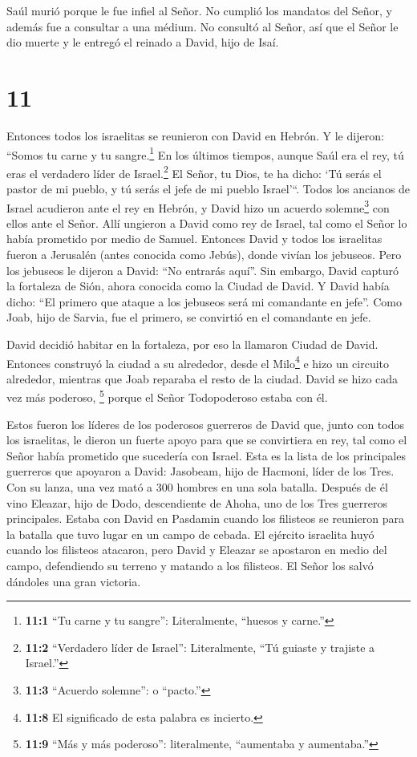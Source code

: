  Saúl murió porque le fue infiel al Señor. No cumplió los
mandatos del Señor, y además fue a consultar a una médium. 
No consultó al Señor, así que el Señor le dio muerte y le entregó el
reinado a David, hijo de Isaí.

\hypertarget{section-10}{%
\section{11}\label{section-10}}

 Entonces todos los israelitas se reunieron con David en
Hebrón. Y le dijeron: ``Somos tu carne y tu sangre.\footnote{\textbf{11:1}
  ``Tu carne y tu sangre'': Literalmente, ``huesos y carne.''}
 En los últimos tiempos, aunque Saúl era el rey, tú eras el
verdadero líder de Israel.\footnote{\textbf{11:2} ``Verdadero líder de
  Israel'': Literalmente, ``Tú guiaste y trajiste a Israel.''} El Señor,
tu Dios, te ha dicho: `Tú serás el pastor de mi pueblo, y tú serás el
jefe de mi pueblo Israel'``.  Todos los ancianos de Israel
acudieron ante el rey en Hebrón, y David hizo un acuerdo
solemne\footnote{\textbf{11:3} ``Acuerdo solemne'': o ``pacto.''} con
ellos ante el Señor. Allí ungieron a David como rey de Israel, tal como
el Señor lo había prometido por medio de Samuel.  Entonces
David y todos los israelitas fueron a Jerusalén (antes conocida como
Jebús), donde vivían los jebuseos.  Pero los jebuseos le
dijeron a David: ``No entrarás aquí''. Sin embargo, David capturó la
fortaleza de Sión, ahora conocida como la Ciudad de David. 
Y David había dicho: ``El primero que ataque a los jebuseos será mi
comandante en jefe''. Como Joab, hijo de Sarvia, fue el primero, se
convirtió en el comandante en jefe.

 David decidió habitar en la fortaleza, por eso la llamaron
Ciudad de David.  Entonces construyó la ciudad a su
alrededor, desde el Milo\footnote{\textbf{11:8} El significado de esta
  palabra es incierto.} e hizo un circuito alrededor, mientras que Joab
reparaba el resto de la ciudad.  David se hizo cada vez más
poderoso, \footnote{\textbf{11:9} ``Más y más poderoso'': literalmente,
  ``aumentaba y aumentaba.''} porque el Señor Todopoderoso estaba con
él.

 Estos fueron los líderes de los poderosos guerreros de
David que, junto con todos los israelitas, le dieron un fuerte apoyo
para que se convirtiera en rey, tal como el Señor había prometido que
sucedería con Israel.  Esta es la lista de los principales
guerreros que apoyaron a David: Jasobeam, hijo de Hacmoni, líder de los
Tres. Con su lanza, una vez mató a 300 hombres en una sola batalla.
 Después de él vino Eleazar, hijo de Dodo, descendiente de
Ahoha, uno de los Tres guerreros principales.  Estaba con
David en Pasdamin cuando los filisteos se reunieron para la batalla que
tuvo lugar en un campo de cebada. El ejército israelita huyó cuando los
filisteos atacaron,  pero David y Eleazar se apostaron en
medio del campo, defendiendo su terreno y matando a los filisteos. El
Señor los salvó dándoles una gran victoria.

